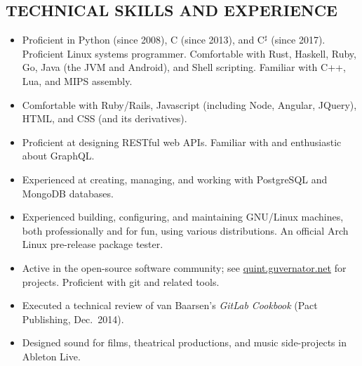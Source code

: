 \documentclass{res}     %
\begin{document}
\begin{resume}
\section{TECHNICAL SKILLS AND EXPERIENCE}
\vspace{5mm}
\begin{itemize}[leftmargin=5mm]
\item Proficient in Python (since 2008), C (since 2013), and C$^\sharp$ (since 2017). Proficient Linux systems programmer. Comfortable with Rust, Haskell, Ruby, Go, Java (the JVM and Android), and Shell scripting. Familiar with C++, Lua, and MIPS assembly.
\item Comfortable with Ruby/Rails, Javascript (including Node, Angular, JQuery), HTML, and CSS (and its derivatives).
\item Proficient at designing RESTful web APIs. Familiar with and enthusiastic about GraphQL.
\item Experienced at creating, managing, and working with PostgreSQL and MongoDB databases.
\item Experienced building, configuring, and maintaining GNU/Linux machines, both professionally and for fun, using various distributions. An official Arch Linux pre-release package tester.
\item Active in the open-source software community; see \url{quint.guvernator.net} for projects. Proficient with git and related tools.
\item Executed a technical review of van Baarsen's \emph{GitLab Cookbook} (Pact Publishing, Dec.\ 2014).
\item Designed sound for films, theatrical productions, and music side-projects in Ableton Live.
\end{itemize}


\end{resume}
\end{document}
